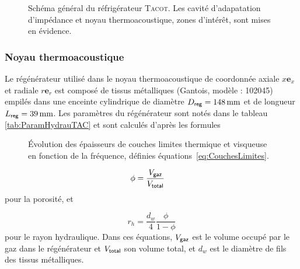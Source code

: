 \begin{figure}[!ht]
    \centering
    
    \caption[Schéma général du réfrigérateur \textsc{Tacot} et mise en évidence des zones d'intérêt pour cette thèse]{Schéma général du réfrigérateur \textsc{Tacot}. Les \colorbox{MatlabYellow}{cavité d'adapatation d'impédance} et \colorbox{MatlabOrange}{noyau thermoacoustique}, zones d'intérêt, sont mises en évidence.}
    \label{fig:SchemaGeneralTACOT}
\end{figure}



\subsubsection{Noyau thermoacoustique}

Le régénérateur utilisé dans le noyau thermoacoustique de coordonnée axiale $x \mathbf e_x$ et radiale $r \mathbf e_r$ est composé de tissus métalliques (Gantois, modèle : 102045) empilés dans une enceinte cylindrique de diamètre $D_{\sf reg}=\qty{148}{\mm}$ et de longueur $L_{\sf reg}=\qty{39}{\mm}$. Les paramètres du régénérateur sont notés dans le tableau \ref{tab:ParamHydrauTAC} et sont calculés d'après les formules 

\begin{figure}[!ht]
    \centering
    
    \caption{\'Evolution des épaisseurs de couches limites thermique et visqueuse en fonction de la fréquence, définies équations~\eqref{eq:CouchesLimites}.}
    \label{fig:dKdV}
\end{figure}

\begin{align}
\phi &= \frac{V_{\sf gaz}}{V_{\sf total}} \label{eq:DefPorosity_Volume}%
\end{align}
pour la porosité, et

\begin{equation}
r_h = \frac{d_w}{4}\frac{\phi}{1-\phi}
\label{eq:DefRayonHydrauGantois}
\end{equation}
pour le rayon hydraulique. Dans ces équations, $V_{\sf gaz}$ est le volume occupé par le gaz dans le régénérateur et $V_{\sf total}$ son volume total, et $d_w$ est le diamètre de fils des tissus métalliques.



